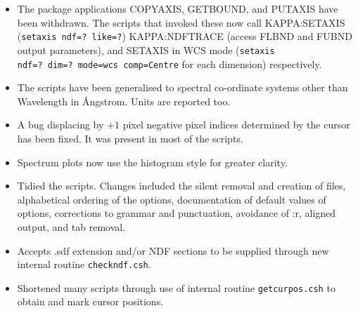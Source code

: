 \documentclass[twoside,11pt]{article}
\newcommand{\xref}[3]{#1}
\begin{document}
\begin{itemize}

\item The package applications COPYAXIS, GETBOUND, and PUTAXIS have
been withdrawn.  The scripts that invoked these now call 
\xref{KAPPA:SETAXIS}{sun95}{SETAXIS} ({\tt setaxis ndf=?~like=?})
\xref{KAPPA:NDFTRACE}{sun95}{NDFTRACE} (access FLBND and FUBND output
parameters), and \xref{SETAXIS in WCS mode}{sun95}{SETAXIS}
({\tt setaxis ndf=?~dim=?~mode=wcs comp=Centre} for each dimension)
respectively.

\item The scripts have been generalised to spectral co-ordinate
systems other than Wavelength in {\AA}ngstrom.  Units are reported too.

\item A bug displacing by $+1$ pixel negative pixel indices determined
by the cursor has been fixed.  It was present in most of the scripts.

\item Spectrum plots now use the histogram style for greater clarity.

\item Tidied the scripts.  Changes included the silent removal and
creation of files, alphabetical ordering of the options, documentation
of default values of options, corrections to grammar and punctuation,
avoidance of :r, aligned output, and tab removal.

\item Accepts .sdf extension and/or NDF sections to be supplied
through new internal routine {\tt checkndf.csh}.

\item Shortened many scripts through use of internal routine
{\tt getcurpos.csh} to obtain and mark cursor positions.

\end{itemize}
\end{document}
